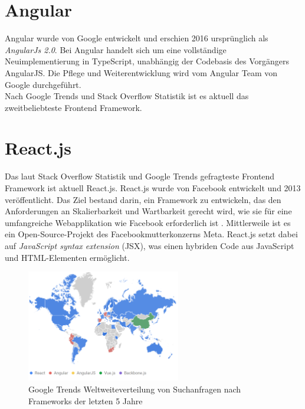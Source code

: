 \section{Angular}
Angular wurde von Google entwickelt und erschien 2016 ursprünglich als \emph{AngularJs 2.0}.
Bei Angular handelt sich um eine vollständige Neuimplementierung in TypeScript, unabhängig der Codebasis des Vorgängers AngularJS.
Die Pflege und Weiterentwicklung wird vom Angular Team von Google durchgeführt. \cite[S. 209-210]{bin2019}
\\
Nach Google Trends \cite{googleTrends} und Stack Overflow Statistik  \cite{stackoverflowStats} ist es aktuell das zweitbeliebteste
Frontend Framework.

\section{React.js}
Das laut Stack Overflow Statistik \cite{stackoverflowStats} und Google Trends \cite{googleTrends} gefragteste Frontend Framework ist aktuell React.js.
React.js wurde von Facebook entwickelt und 2013 veröffentlicht.
Das Ziel bestand darin, ein Framework zu entwickeln,
das den Anforderungen an Skalierbarkeit und Wartbarkeit gerecht wird,
wie sie für eine umfangreiche Webapplikation wie Facebook erforderlich ist \cite[S. 1]{gackenheimer2015introduction}.
Mittlerweile ist es ein Open-Source-Projekt des Facebookmutterkonzerns Meta.
React.js setzt dabei auf \emph{JavaScript syntax extension} (JSX), was einen hybriden Code aus JavaScript und HTML-Elementen ermöglicht. \cite{react}


\begin{figure}[!htb]
    \centering
    \includegraphics[width=0.6\textwidth]{img/Google Stats/2023-04-26 12_20_26-React, Angular, AngularJS, Vue.js, Backbone.js - Erkunden - Google Trends}
    \caption{Google Trends Weltweiteverteilung von Suchanfragen nach Frameworks der letzten 5 Jahre \cite{googleTrends}}
    \label{fig:google_trends_world}
\end{figure}
